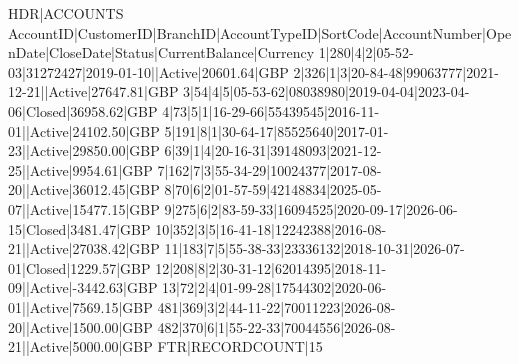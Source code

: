 HDR|ACCOUNTS
AccountID|CustomerID|BranchID|AccountTypeID|SortCode|AccountNumber|OpenDate|CloseDate|Status|CurrentBalance|Currency
1|280|4|2|05-52-03|31272427|2019-01-10||Active|20601.64|GBP
2|326|1|3|20-84-48|99063777|2021-12-21||Active|27647.81|GBP
3|54|4|5|05-53-62|08038980|2019-04-04|2023-04-06|Closed|36958.62|GBP
4|73|5|1|16-29-66|55439545|2016-11-01||Active|24102.50|GBP
5|191|8|1|30-64-17|85525640|2017-01-23||Active|29850.00|GBP
6|39|1|4|20-16-31|39148093|2021-12-25||Active|9954.61|GBP
7|162|7|3|55-34-29|10024377|2017-08-20||Active|36012.45|GBP
8|70|6|2|01-57-59|42148834|2025-05-07||Active|15477.15|GBP
9|275|6|2|83-59-33|16094525|2020-09-17|2026-06-15|Closed|3481.47|GBP
10|352|3|5|16-41-18|12242388|2016-08-21||Active|27038.42|GBP
11|183|7|5|55-38-33|23336132|2018-10-31|2026-07-01|Closed|1229.57|GBP
12|208|8|2|30-31-12|62014395|2018-11-09||Active|-3442.63|GBP
13|72|2|4|01-99-28|17544302|2020-06-01||Active|7569.15|GBP
481|369|3|2|44-11-22|70011223|2026-08-20||Active|1500.00|GBP
482|370|6|1|55-22-33|70044556|2026-08-21||Active|5000.00|GBP
FTR|RECORDCOUNT|15


